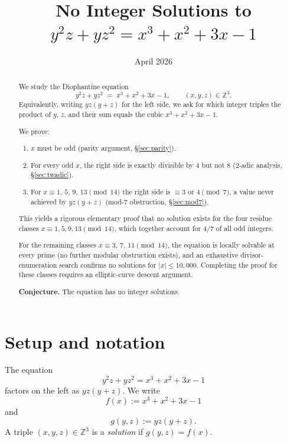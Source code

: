\documentclass[12pt, a4paper]{article}
\theoremstyle{definition}
\newcommand{\Z}{\mathbb{Z}}
\begin{document}
\title{\bfseries No Integer Solutions to\\[4pt]
  $y^2 z + y z^2 = x^3 + x^2 + 3x - 1$}
\author{}
\date{April 2026}
\maketitle

\begin{abstract}
We study the Diophantine equation
\[
  y^2 z + y z^2 \;=\; x^3 + x^2 + 3x - 1, \qquad (x,y,z)\in\Z^3.
\]
Equivalently, writing $yz(y+z)$ for the left side, we ask for which
integer triples the product of $y$, $z$, and their sum equals the cubic
$x^3+x^2+3x-1$.

We prove:
\begin{enumerate}
  \item $x$ must be odd (parity argument, \S\ref{sec:parity}).
  \item For every odd $x$, the right side is exactly divisible by $4$
        but not $8$ (2-adic analysis, \S\ref{sec:twadic}).
  \item For $x \equiv 1,\,5,\,9,\,13\pmod{14}$ the right side is
        $\equiv 3$ or $4\pmod 7$, a value never achieved by $yz(y+z)$
        (mod-7 obstruction, \S\ref{sec:mod7}).
\end{enumerate}
This yields a rigorous elementary proof that no solution exists for
the four residue classes $x\equiv 1,5,9,13\pmod{14}$, which together
account for $4/7$ of all odd integers.

For the remaining classes $x\equiv 3,\,7,\,11\pmod{14}$, the equation
is locally solvable at every prime (no further modular obstruction
exists), and an exhaustive divisor-enumeration search confirms no
solutions for $|x|\le 10{,}000$.  Completing the proof for these
classes requires an elliptic-curve descent argument.

\medskip\noindent\textbf{Conjecture.}  The equation has no integer solutions.
\end{abstract}

\tableofcontents

\section{Setup and notation}

The equation
\begin{equation}\label{eq:main}
  y^2 z + y z^2 = x^3 + x^2 + 3x - 1
\end{equation}
factors on the left as $yz(y+z)$.  We write
\[
  f(x) := x^3 + x^2 + 3x - 1
\]
and
\[
  g(y,z) := yz(y+z).
\]
A triple $(x,y,z)\in\Z^3$ is a \emph{solution} if $g(y,z)=f(x)$.
\end{document}

